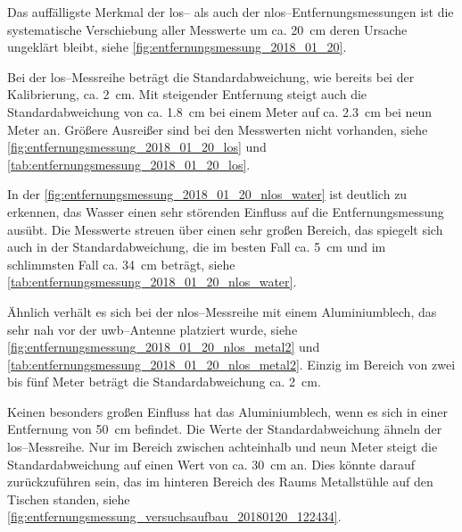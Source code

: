 Das auffälligste Merkmal der \Gls{los}-- als auch der \Gls{nlos}--Entfernungsmessungen ist die systematische Verschiebung aller Messwerte um ca. \SI{20}{\centi\meter} deren Ursache ungeklärt bleibt, siehe \autoref{fig:entfernungsmessung_2018_01_20}.

Bei der \Gls{los}--Messreihe beträgt die Standardabweichung, wie bereits bei der Kalibrierung, ca. \SI{2}{\centi\meter}. Mit steigender Entfernung steigt auch die Standardabweichung von ca. \SI{1.8}{\centi\meter} bei einem Meter auf ca. \SI{2.3}{\centi\meter} bei neun Meter an. Größere Ausreißer sind bei den Messwerten nicht vorhanden, siehe \autoref{fig:entfernungsmessung_2018_01_20_los} und \autoref{tab:entfernungsmessung_2018_01_20_los}.

In der \autoref{fig:entfernungsmessung_2018_01_20_nlos_water} ist deutlich zu erkennen, das Wasser einen sehr störenden Einfluss auf die Entfernungsmessung ausübt. Die Messwerte streuen über einen sehr großen Bereich, das spiegelt sich auch in der Standardabweichung, die im besten Fall ca. \SI{5}{\centi\meter} und im schlimmsten Fall ca. \SI{34}{\centi\meter} beträgt, siehe \autoref{tab:entfernungsmessung_2018_01_20_nlos_water}.

Ähnlich verhält es sich bei der \Gls{nlos}--Messreihe mit einem Aluminiumblech, das sehr nah vor der \Gls{uwb}--Antenne platziert wurde, siehe \autoref{fig:entfernungsmessung_2018_01_20_nlos_metal2} und \autoref{tab:entfernungsmessung_2018_01_20_nlos_metal2}. Einzig im Bereich von zwei bis fünf Meter beträgt die Standardabweichung ca. \SI{2}{\centi\meter}.

Keinen besonders großen Einfluss hat das Aluminiumblech, wenn es sich in einer Entfernung von \SI{50}{\centi\meter} befindet. Die Werte der Standardabweichung ähneln der \Gls{los}--Messreihe. Nur im Bereich zwischen achteinhalb und neun Meter steigt die Standardabweichung auf einen Wert von ca. \SI{30}{\centi\meter} an. Dies könnte darauf zurückzuführen sein, das im hinteren Bereich des Raums Metallstühle auf den Tischen standen, siehe \autoref{fig:entfernungsmessung_versuchsaufbau_20180120_122434}.


